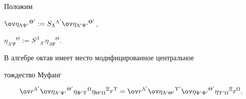 Положим




$\ov \eta_{\Lambda \Psi '}{}^{\Theta '}:=S_\Lambda{}^{\Lambda '}


\ov \eta_{\Lambda' \Psi '}{}^{\Theta '}$,


$\eta_{\Lambda' \Psi}{}^\Theta:=S^\Lambda{}_{\Lambda '}


\eta_{\Lambda \Psi}{}^\Theta$.







\begin{thm}


\label{theorem4}


В алгебре октав имеет место модифицированное центральное


тождество Муфанг


\begin{equation}


\label{e51}


\ov r^{\Lambda '} \ov \eta_{\Lambda ' \Psi '}{}^{\Theta '}


\eta_{\Phi '\Upsilon}{}^\Omega \eta_{\Theta '\Omega}{}^\Xi r^\Upsilon=


\ov r^{\Lambda '} \ov \eta_{\Lambda ' \Theta '}{}^{\Upsilon '}


\ov \eta_{\Psi '\Phi '}{}^{\Theta '} \eta_{\Upsilon '\Omega}{}^\Xi


r^\Omega.


\end{equation}


\end{thm}






